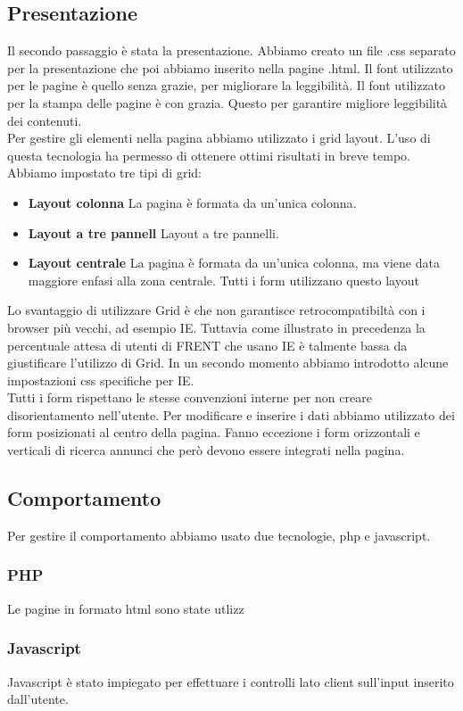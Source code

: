 \documentclass[1_relazione.tex]{subfiles}
\begin{document}
\subsection{Presentazione}
Il secondo passaggio è stata la presentazione.  Abbiamo creato un file .css separato per la presentazione che poi abbiamo inserito nella pagine .html. Il font utilizzato per le pagine è quello senza grazie, per migliorare la leggibilità. Il font utilizzato per la stampa delle pagine è con grazia. Questo per garantire migliore leggibilità dei contenuti.  \\

Per gestire gli elementi nella pagina abbiamo utilizzato i grid layout. L'uso di questa tecnologia ha permesso di ottenere ottimi risultati in breve tempo. Abbiamo impostato tre tipi di grid:
\begin{itemize}
\item \textbf{Layout colonna}  La pagina è formata da un'unica colonna.
\item \textbf{Layout a tre pannell} Layout a tre pannelli.
\item \textbf{Layout centrale} La pagina è formata da un'unica colonna, ma viene data maggiore enfasi alla zona centrale. Tutti i form utilizzano questo layout
\end{itemize}

Lo svantaggio di utilizzare Grid è che non garantisce retrocompatibiltà con i browser più vecchi, ad esempio IE. Tuttavia come illustrato in precedenza la percentuale attesa di utenti di FRENT che usano IE è talmente bassa da giustificare l'utilizzo di Grid. In un secondo momento abbiamo introdotto alcune impostazioni css specifiche per IE. \\

Tutti i form rispettano le stesse convenzioni interne per non creare disorientamento nell'utente. Per modificare e inserire i dati abbiamo utilizzato dei form posizionati al centro della pagina. Fanno eccezione i form orizzontali e verticali di ricerca annunci che però devono essere integrati nella pagina. 

\subsection{Comportamento}
Per gestire il comportamento abbiamo usato due tecnologie, php e javascript.

\subsubsection{PHP}
Le pagine in formato html sono state utlizz


\subsubsection{Javascript}
Javascript è stato impiegato per effettuare i controlli lato client sull'input inserito dall'utente.
\end{document}
